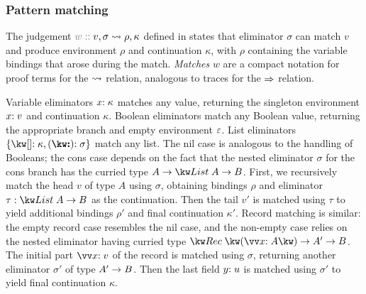 \subsubsection{Pattern matching}
\label{sec:core-language:pattern-match}

The judgement $\explVal{w}{v, \sigma \matchR \rho, \kappa}$ defined in  states that eliminator $\sigma$ can match $v$ and produce environment $\rho$ and continuation $\kappa$, with $\rho$ containing the variable bindings that arose during the match. \emph{Matches} $w$ are a compact notation for proof terms for the $\rightsquigarrow$ relation, analogous to traces for the $\Rightarrow$ relation.

Variable eliminators ${x}{:}\;{\kappa}$ matches any value, returning the singleton environment $x{:}\;v$ and continuation $\kappa$. Boolean eliminators match any Boolean value, returning the appropriate branch and empty environment $\varepsilon$. List eliminators $\elimList{\kappa}{\sigma}$ match any list. The nil case is analogous to the handling of Booleans; the cons case depends on the fact that the nested eliminator $\sigma$ for the cons branch has the curried type $\tyFun{A}{\tyFun{\tyList{A}}{B}}$. First, we recursively match the head $v$ of type $A$ using $\sigma$, obtaining bindings $\rho$ and eliminator $\tau: \tyFun{\tyList{A}}{B}$ as the continuation. Then the tail $v'$ is matched using $\tau$ to yield additional bindings $\rho'$ and final continuation $\kappa'$. Record matching is similar: the empty record case resembles the nil case, and the non-empty case relies on the nested eliminator having curried type $\tyFun{\tyRec{\vec{\bind{x}{A}}}}{\tyFun{A'}{B}}$. The initial part $\vec{\bind{x}{v}}$ of the record is matched using $\sigma$, returning another eliminator $\sigma'$ of type ${A'}\rightarrow{B}$. Then the last field $y{:}\;u$ is matched using $\sigma'$ to yield final continuation $\kappa$.
